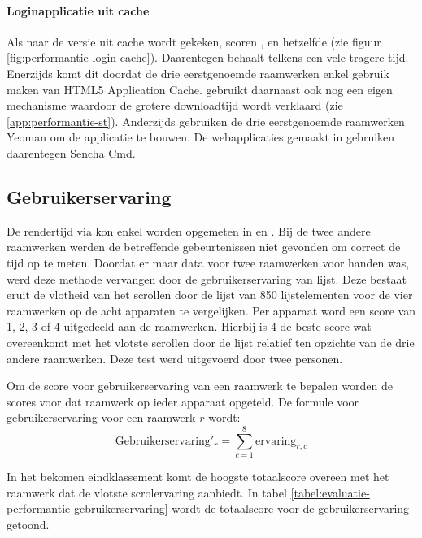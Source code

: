 \paragraph{Loginapplicatie uit cache}
Als naar de versie uit cache wordt gekeken, scoren \kendo{}, \jqm{} en \lungo{} hetzelfde (zie figuur \ref{fig:performantie-login-cache}).
Daarentegen behaalt \st{} telkens een vele tragere tijd.
Enerzijds komt dit doordat de drie eerstgenoemde raamwerken enkel gebruik maken van HTML5 Application Cache.
\st{} gebruikt daarnaast ook nog een eigen mechanisme waardoor de grotere downloadtijd wordt verklaard (zie \ref{app:performantie-st}).
Anderzijds gebruiken de drie eerstgenoemde raamwerken Yeoman om de applicatie te bouwen.
De webapplicaties gemaakt in \st{} gebruiken daarentegen Sencha Cmd.


\subsection{Gebruikerservaring}
\label{sec:evaluatie-gebruikerservaring}
De rendertijd via \js{} kon enkel worden opgemeten in \jqm{} en \kendo{}.
Bij de twee andere raamwerken werden de betreffende gebeurtenissen niet gevonden om correct de tijd op te meten.
Doordat er maar data voor twee raamwerken voor handen was, werd deze methode vervangen door de gebruikerservaring van lijst.
Deze bestaat eruit de vlotheid van het scrollen door de lijst van 850 lijstelementen voor de vier raamwerken op de acht apparaten te vergelijken.
Per apparaat word een score van 1, 2, 3 of 4 uitgedeeld aan de raamwerken.
Hierbij is 4 de beste score wat overeenkomt met het vlotste scrollen door de lijst relatief ten opzichte van de drie andere raamwerken.
Deze test werd uitgevoerd door twee personen.

Om de score voor gebruikerservaring van een raamwerk te bepalen worden de scores voor dat raamwerk op ieder apparaat opgeteld. De formule voor gebruikerservaring voor een raamwerk $r$ wordt:
\begin{equation}
  \text{Gebruikerservaring}'_r = \sum_{c=1}^{8}{\text{ervaring}_{r,c}}
  \label{eq:performantie-gebruikservaring}
\end{equation}

In het bekomen eindklassement komt de hoogste totaalscore overeen met het raamwerk dat de vlotste scrolervaring aanbiedt. In tabel \ref{tabel:evaluatie-performantie-gebruikerservaring} wordt de totaalscore voor de gebruikerservaring getoond.

